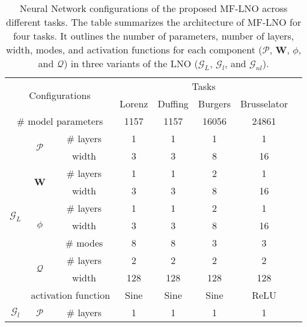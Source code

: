 \begin{table}[!htbp]
\caption{Neural Network configurations of the proposed MF-LNO across different tasks. The table summarizes the architecture of MF-LNO for four tasks. It outlines the number of parameters, number of layers, width, modes, and activation functions for each component ($\mathcal{P}$, $\mathbf{W}$, $\phi$, and $\mathcal{Q}$) in three variants of the LNO ($\mathcal{G}_L$, $\mathcal{G}_l$, and $\mathcal{G}_{nl}$).}\label{tab:network_config}
\begin{tabular}{cccccccc}
\toprule
\multicolumn{3}{c}{\multirow{2}{*}{Configurations}} & \multicolumn{4}{c}{Tasks} \\ \cline{4-7}
\multicolumn{3}{c}{}              & Lorenz & Duffing & Burgers & Brusselator \\ \midrule
\multicolumn{3}{c}{\# model parameters}      &   1157     &   1157      &    16056     &    24861    \\ \midrule
\multirow{10}{*}{$\mathcal G_{L}$}
   & \multirow{2}{*}{$\mathcal P$}      & \# layers    &   1     &   1      &    1     &   1       \\
   &                          & width        &   3     &    3     &     8    &      16     \\ \cline{2-7}
   & \multirow{2}{*}{$\mathbf{W}$}      & \# layers    &   1     &     1    &   2      &   1        \\
   &                          & width        &    3    &   3      &    8     &      16     \\ \cline{2-7}
   & \multirow{3}{*}{$\phi$}     & \# layers    &    1    &    1     &    2     &     1      \\
   &                          & width        &   3     &     3    &     8    &     16      \\
   &                          & \# modes      &   8     &    8     &    3     &      3     \\ \cline{2-7}
   & \multirow{2}{*}{$\mathcal Q$}      & \# layers    &   2     &     2    &     2    &   2        \\
   &                          & width        &   128     &   128      &     128    &      128     \\ \cline{2-7}
   & \multicolumn{2}{l}{activation function} &    Sine    &    Sine     &   Sine      &    ReLU       \\ \midrule
\multirow{9}{*}{$\mathcal G_{l}$}
   & \multirow{2}{*}{$\mathcal P$}      & \# layers    &    1    &     1    &   1      &   1        \\

\end{tabular}
\end{table}

